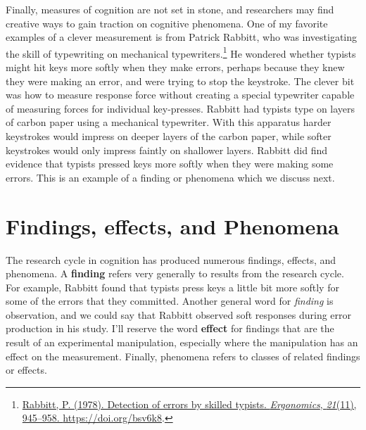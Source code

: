 \documentclass[
  oneside,
  12pt]{crumpbook}
\begin{document}
Finally, measures of cognition are not set in stone, and researchers may find creative ways to gain traction on cognitive phenomena. One of my favorite examples of a clever measurement is from Patrick Rabbitt, who was investigating the skill of typewriting on mechanical typewriters.\footnote{\protect\hyperlink{ref-rabbittDetectionErrorsSkilled1978}{Rabbitt, P. (1978). Detection of errors by skilled typists. \emph{Ergonomics}, \emph{21}(11), 945--958. \url{https://doi.org/bsv6k8}}.} He wondered whether typists might hit keys more softly when they make errors, perhaps because they knew they were making an error, and were trying to stop the keystroke. The clever bit was how to measure response force without creating a special typewriter capable of measuring forces for individual key-presses. Rabbitt had typists type on layers of carbon paper using a mechanical typewriter. With this apparatus harder keystrokes would impress on deeper layers of the carbon paper, while softer keystrokes would only impress faintly on shallower layers. Rabbitt did find evidence that typists pressed keys more softly when they were making some errors. This is an example of a finding or phenomena which we discuss next.

\hypertarget{findings-effects-and-phenomena}{%
\section{Findings, effects, and Phenomena}\label{findings-effects-and-phenomena}}

The research cycle in cognition has produced numerous findings, effects, and phenomena. A \textbf{finding} refers very generally to results from the research cycle. For example, Rabbitt found that typists press keys a little bit more softly for some of the errors that they committed. Another general word for \emph{finding} is observation, and we could say that Rabbitt observed soft responses during error production in his study. I'll reserve the word \textbf{effect} for findings that are the result of an experimental manipulation, especially where the manipulation has an effect on the measurement. Finally, phenomena refers to classes of related findings or effects.
\end{document}
